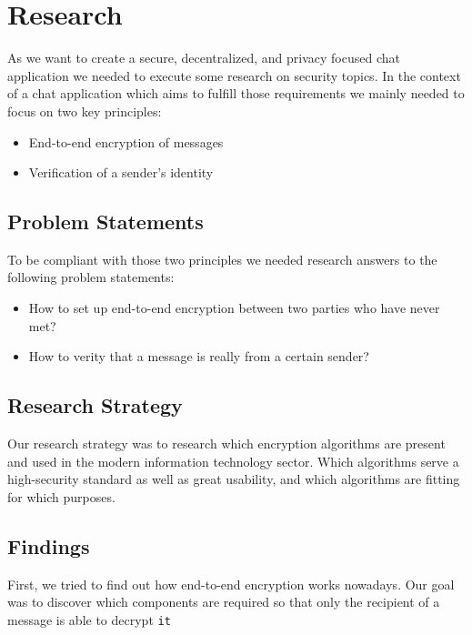\chapter{Research}\label{ch:research}

As we want to create a secure, decentralized, and privacy focused chat application we needed to execute some research on
security topics.
In the context of a chat application which aims to fulfill those requirements we mainly needed to focus on two key
principles:

\begin{itemize}
    \setlength\itemsep{-.5em}
    \item End-to-end encryption of messages
    \item Verification of a sender's identity
\end{itemize}

\section{Problem Statements}\label{sec:problem-statements}

To be compliant with those two principles we needed research answers to the following problem statements:
\begin{itemize}
    \setlength\itemsep{-.5em}
    \item How to set up end-to-end encryption between two parties who have never met?
    \item How to verity that a message is really from a certain sender?
\end{itemize}

\section{Research Strategy}\label{sec:research-strategy}
Our research strategy was to research which encryption algorithms are present and used in the modern information
technology sector.
Which algorithms serve a high-security standard as well as great usability, and which algorithms are fitting for which
purposes.

\section{Findings}\label{sec:findings}
First, we tried to find out how end-to-end encryption works nowadays.
Our goal was to discover which components are required so that only the recipient of a message is able to decrypt \texttt{it}


